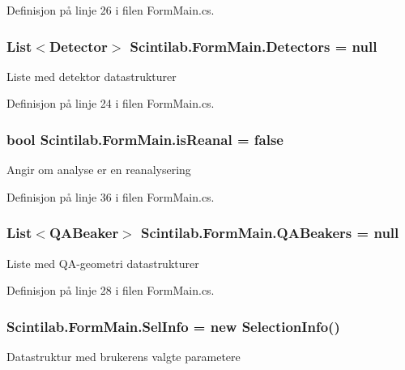 Definisjon på linje 26 i filen Form\+Main.\+cs.

\hypertarget{class_scintilab_1_1_form_main_a88f16134102d9e4c5630adf5ff97f090}{
\subsubsection[{Detectors}]{\setlength{\rightskip}{0pt plus 5cm}List$<${\bf Detector}$>$ Scintilab.\+Form\+Main.\+Detectors = null}}\label{class_scintilab_1_1_form_main_a88f16134102d9e4c5630adf5ff97f090}
Liste med detektor datastrukturer 

Definisjon på linje 24 i filen Form\+Main.\+cs.

\hypertarget{class_scintilab_1_1_form_main_a389e9c6697c567d84058d178053a837c}{
\subsubsection[{is\+Reanal}]{\setlength{\rightskip}{0pt plus 5cm}bool Scintilab.\+Form\+Main.\+is\+Reanal = false\hspace{0.3cm}{\ttfamily [private]}}}\label{class_scintilab_1_1_form_main_a389e9c6697c567d84058d178053a837c}
Angir om analyse er en reanalysering 

Definisjon på linje 36 i filen Form\+Main.\+cs.

\hypertarget{class_scintilab_1_1_form_main_af318208d55e4a144a14abde1adc7559d}{
\subsubsection[{Q\+A\+Beakers}]{\setlength{\rightskip}{0pt plus 5cm}List$<${\bf Q\+A\+Beaker}$>$ Scintilab.\+Form\+Main.\+Q\+A\+Beakers = null\hspace{0.3cm}{\ttfamily [private]}}}\label{class_scintilab_1_1_form_main_af318208d55e4a144a14abde1adc7559d}
Liste med Q\+A-\/geometri datastrukturer 

Definisjon på linje 28 i filen Form\+Main.\+cs.

\hypertarget{class_scintilab_1_1_form_main_a57c8340ae2caaec775ad70d8036514fb}{
\subsubsection[{Sel\+Info}]{ Scintilab.\+Form\+Main.\+Sel\+Info = new {\bf Selection\+Info}()\hspace{0.3cm}{\ttfamily [private]}}}\label{class_scintilab_1_1_form_main_a57c8340ae2caaec775ad70d8036514fb}
Datastruktur med brukerens valgte parametere 

